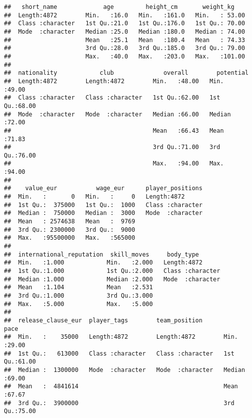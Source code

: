 \documentclass[
]{article}
\begin{document}
\begin{verbatim}
##   short_name             age         height_cm       weight_kg     
##  Length:4872        Min.   :16.0   Min.   :161.0   Min.   : 53.00  
##  Class :character   1st Qu.:21.0   1st Qu.:176.0   1st Qu.: 70.00  
##  Mode  :character   Median :25.0   Median :180.0   Median : 74.00  
##                     Mean   :25.1   Mean   :180.4   Mean   : 74.33  
##                     3rd Qu.:28.0   3rd Qu.:185.0   3rd Qu.: 79.00  
##                     Max.   :40.0   Max.   :203.0   Max.   :101.00  
##                                                                    
##  nationality            club              overall        potential    
##  Length:4872        Length:4872        Min.   :48.00   Min.   :49.00  
##  Class :character   Class :character   1st Qu.:62.00   1st Qu.:68.00  
##  Mode  :character   Mode  :character   Median :66.00   Median :72.00  
##                                        Mean   :66.43   Mean   :71.83  
##                                        3rd Qu.:71.00   3rd Qu.:76.00  
##                                        Max.   :94.00   Max.   :94.00  
##                                                                       
##    value_eur           wage_eur      player_positions  
##  Min.   :       0   Min.   :     0   Length:4872       
##  1st Qu.:  375000   1st Qu.:  1000   Class :character  
##  Median :  750000   Median :  3000   Mode  :character  
##  Mean   : 2574638   Mean   :  9769                     
##  3rd Qu.: 2300000   3rd Qu.:  9000                     
##  Max.   :95500000   Max.   :565000                     
##                                                        
##  international_reputation  skill_moves     body_type        
##  Min.   :1.000            Min.   :2.000   Length:4872       
##  1st Qu.:1.000            1st Qu.:2.000   Class :character  
##  Median :1.000            Median :2.000   Mode  :character  
##  Mean   :1.104            Mean   :2.531                     
##  3rd Qu.:1.000            3rd Qu.:3.000                     
##  Max.   :5.000            Max.   :5.000                     
##                                                             
##  release_clause_eur  player_tags        team_position           pace      
##  Min.   :    35000   Length:4872        Length:4872        Min.   :29.00  
##  1st Qu.:   613000   Class :character   Class :character   1st Qu.:61.00  
##  Median :  1300000   Mode  :character   Mode  :character   Median :69.00  
##  Mean   :  4841614                                         Mean   :67.67  
##  3rd Qu.:  3900000                                         3rd Qu.:75.00  

\end{verbatim}
\end{document}
